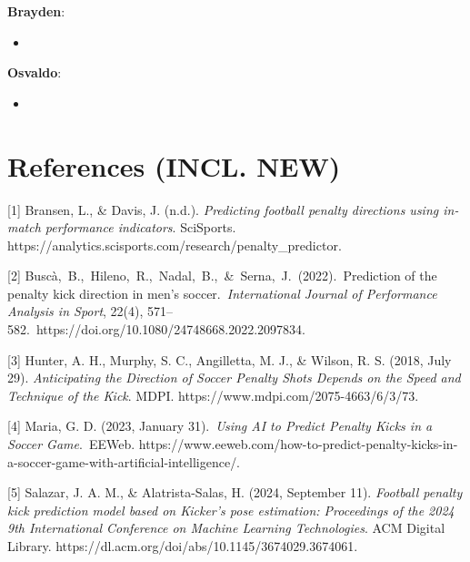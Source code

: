 \documentclass{article}
\begin{document}
{\bf Brayden}: 
\begin{itemize}
    \item 
\end{itemize}

{\bf Osvaldo}: 
\begin{itemize}
    \item 
\end{itemize}


\section*{References (INCL. NEW)}

\medskip

{
\small

[1] Bransen, L., \& Davis, J. (n.d.). {\it Predicting football penalty directions using in-match performance indicators}. SciSports. https://analytics.scisports.com/research/penalty\_predictor.

[2] Buscà,\ B.,\ Hileno,\ R.,\ Nadal,\ B.,\ \&\ Serna,\ J.\ (2022).\ Prediction of the penalty kick direction in men’s soccer.\ {\it International Journal of Performance Analysis in Sport}, 22(4), 571–582.\ https://doi.org/10.1080/24748668.2022.2097834.

[3] Hunter, A. H., Murphy, S. C., Angilletta, M. J., \& Wilson, R. S. (2018, July 29). {\it Anticipating the Direction of Soccer Penalty Shots Depends on the Speed and Technique of the Kick}. MDPI. https://www.mdpi.com/2075-4663/6/3/73.

[4] Maria, G. D. (2023, January 31).\ {\it Using AI to Predict Penalty Kicks in a Soccer Game}.\ EEWeb. https://www.eeweb.com/how-to-predict-penalty-kicks-in-a-soccer-game-with-artificial-intelligence/.

[5] Salazar, J. A. M., \& Alatrista-Salas, H. (2024, September 11).  {\it Football penalty kick prediction model based on Kicker’s pose estimation: Proceedings of the 2024 9th International Conference on Machine Learning Technologies}. ACM Digital Library. https://dl.acm.org/doi/abs/10.1145/3674029.3674061.

}
\end{document}
